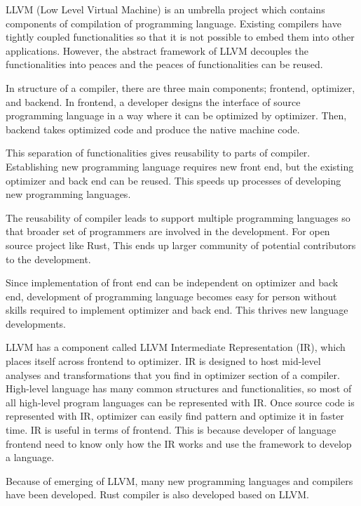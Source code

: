 LLVM (Low Level Virtual Machine) \cite{DBLP:conf/cgo/LattnerA04} is an umbrella project which contains components of compilation of programming language.
Existing compilers have tightly coupled functionalities so that it is not possible to embed them into other applications.
However, the abstract framework of LLVM decouples the functionalities into peaces and the peaces of functionalities can be reused.

In structure of a compiler, there are three main components; frontend, optimizer, and backend. 
In frontend, a developer designs the interface of source programming language in a way where it can be optimized by optimizer. 
Then, backend takes optimized code and produce the native machine code. 

This separation of functionalities gives reusability to parts of compiler. Establishing new programming language requires new front end, 
but the existing optimizer and back end can be reused. This speeds up processes of developing new programming languages.

The reusability of compiler leads to support multiple programming languages 
so that broader set of programmers are involved in the development. 
For open source project like Rust, This ends up larger community of potential contributors to the development.

Since implementation of front end can be independent on optimizer and back end, 
development of programming language becomes easy for person without skills required to implement optimizer and back end.
This thrives new language developments.

LLVM has a component called LLVM Intermediate Representation (IR), 
which places itself across frontend to optimizer. IR is designed to host mid-level analyses and transformations that you find in optimizer section of a compiler.
High-level language has many common structures and functionalities, so most of all high-level program languages can be represented with IR. 
Once source code is represented with IR, optimizer can easily find pattern and optimize it in faster time. 
IR is useful in terms of frontend. This is because developer of language frontend need to know only how the IR works and use the framework to develop a language.

Because of emerging of LLVM, many new programming languages and compilers have been developed. Rust compiler is also developed based on LLVM.


